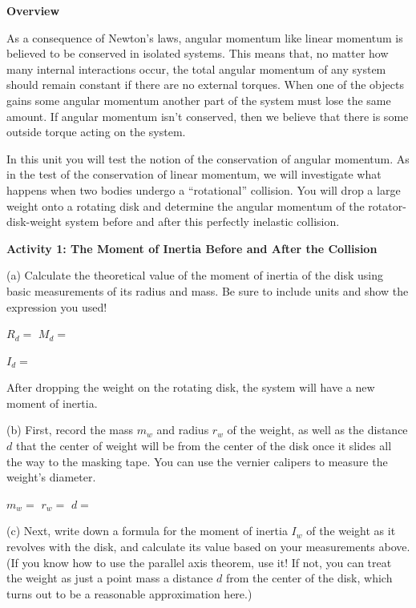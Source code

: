 \bigskip
\textbf{Overview }

As a consequence of Newton's laws, angular momentum like linear momentum is
believed to be conserved in isolated systems. This means that, no matter how
many internal interactions occur, the total angular momentum of any system should remain constant if there are no external torques. When one of the objects gains some angular momentum another part of the system must lose the same amount. If angular momentum isn't conserved, then we believe that there is some outside torque acting on the system. 

In this unit you will test the notion of the conservation of angular momentum.
As in the test of the conservation of linear momentum, we will investigate what
happens when two bodies undergo a ``rotational'' collision.
You will drop a large weight onto a rotating disk and determine 
the angular momentum of the rotator-disk-weight
system before and after this perfectly inelastic collision.

\medskip
\textbf{Activity 1: The Moment of Inertia Before and After the Collision}

(a) Calculate the theoretical value of the moment of inertia of the disk
using basic measurements of its radius and mass. Be sure to include units and
show the expression you used!
\vspace{5mm}

\hspace{0.5in}\( R_{d} =\)  \hfill{}\( M_{d}= \) \hfill{}
\vspace{5mm}

\hspace{0.5in}\( I_{d}= \)
\vspace{5mm}

After dropping the weight on the rotating disk, the system will have a new
moment of inertia. 

(b) First, record the mass $m_w$ and radius $r_w$ of the weight, as well as the distance $d$
that the center of weight will be from the center of the disk once it slides all the way to the
masking tape.  You can use the vernier calipers to measure the weight's diameter.

\medskip
\hspace{0.5in}$m_w=$ \hfill $r_w=$ \hfill $d=$ \hfill 
\bigskip

(c) Next, write down a formula for the moment of inertia $I_w$ of the weight as it revolves with the disk, 
and calculate its value based on your measurements above.  
(If you know how to use the parallel axis theorem, use it!  If not, you can treat the weight as just
a point mass a distance $d$ from the center of the disk, which turns out to be a reasonable approximation here.)

